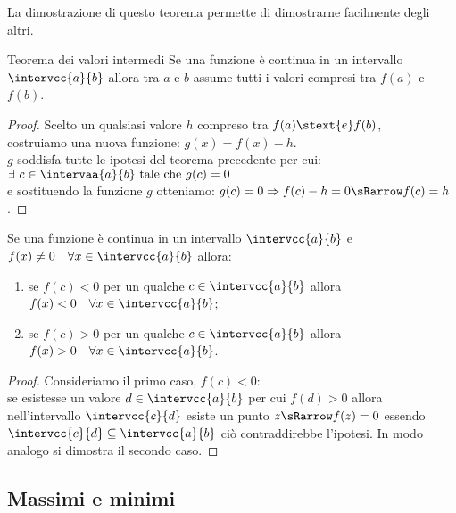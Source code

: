 La dimostrazione di questo teorema permette di dimostrarne facilmente degli 
altri. 

\begin{newcor}{Teorema dei valori intermedi}{}
Se una funzione è continua in un
intervallo \(\intervcc{a}{b}\) allora tra \(a\) e \(b\) assume tutti i 
valori compresi tra \(f(a)\) e \(f(b)\).
\end{newcor}

\begin{proof}
Scelto un qualsiasi valore \(h\) compreso tra \(f(a) \stext{ e } f(b)\), \\
costruiamo una nuova funzione: \quad \(g(x) = f(x)-h\).\\ 
\(g\) soddisfa tutte le ipotesi del teorema precedente per cui: \quad 
\(\exists~c \in \intervaa{a}{b} \text{ tale che } g(c)=0\)\\
e sostituendo la funzione \(g\) otteniamo: \quad 
\(g(c)=0 \Rightarrow f(c) -h=0 \sRarrow f(c)=h\).
\end{proof}

\begin{newcor}{}{}
Se una funzione è continua in un
intervallo \(\intervcc{a}{b}\) e 
\(f(x)\neq 0 \quad \forall x \in \intervcc{a}{b}\) 
allora:
\begin{enumerate}[nosep]
 \item se \(f(c)<0\) \quad per un qualche \quad \(c \in \intervcc{a}{b}\)
 \quad allora \quad \(f(x)<0 \quad \forall x \in \intervcc{a}{b}\);
 \item se \(f(c)>0\) \quad per un qualche \quad \(c \in \intervcc{a}{b}\)
 \quad allora \quad \(f(x)>0 \quad \forall x \in \intervcc{a}{b}\).
\end{enumerate}
\end{newcor}

\begin{proof}
Consideriamo il primo caso, \(f(c) < 0\):\\ 
se esistesse un valore \(d \in \intervcc{a}{b}\) per cui
\(f(d) > 0\) allora nell'intervallo \(\intervcc{c}{d}\) 
esiste un punto \(z \sRarrow f(z) = 0\)
essendo \(\intervcc{c}{d} \subseteq \intervcc{a}{b}\) 
ciò contraddirebbe l'ipotesi.
In modo analogo si dimostra il secondo caso.
\end{proof}

\subsection{Massimi e minimi}
\label{subsec:cont_massimiminimi}

